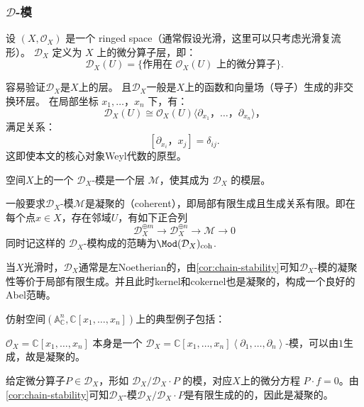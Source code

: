 \subsubsection{$\mathcal{D}$-模}
\begin{definition}
    设 $(X,\mathcal{O}_X)$ 是一个 ringed space（通常假设光滑，这里可以只考虑光滑复流形）。
    $\mathcal{D}_X$ 定义为 $X$ 上的微分算子层，即：
    \[
        \mathcal{D}_X(U) = \{ \text{作用在 } \mathcal{O}_X(U) \text{ 上的微分算子} \}.
    \]
\end{definition}
容易验证$\mathcal{D}_X$是$X$上的层。
且$\mathcal{D}_X$一般是$X$上的函数和向量场（导子）生成的非交换环层。
在局部坐标 $x_1,\dots，x_n$ 下，有：
\[
    \mathcal{D}_X(U) \cong \mathcal{O}_X(U)\langle \partial_{x_1}，\dots，\partial_{x_n} \rangle，
\]
满足关系：
\[
    [\partial_{x_i}， x_j] = \delta_{ij}.
\]
这即使本文的核心对象Weyl代数的原型。



\begin{definition}
    空间$X$上的一个 $\mathcal{D}_X$-模是一个层 $\mathcal{M}$，使其成为 $\mathcal{D}_X$ 的模层。
\end{definition}
\begin{remark}
    一般要求$\mathcal{D}_X$-模$\mathcal{M}$是凝聚的（coherent），即局部有限生成且生成关系有限。即在每个点$x\in X$，存在邻域$U$，有如下正合列
    \begin{equation*}
        \mathcal{D}_X^{\oplus m}\to \mathcal{D}_X^{\oplus n}\to \mathcal{M}\to 0
    \end{equation*}
    同时记这样的 $\mathcal{D}_X$-模构成的范畴为$\Mod(\mathcal{D}_X)_\text{coh}$.
\end{remark}
当$X$光滑时，$\mathcal{D}_X$通常是左Noetherian的，由\ref{cor:chain-stability}可知$\mathcal{D}_X$-模的凝聚性等价于局部有限生成。并且此时kernel和cokernel也是凝聚的，构成一个良好的Abel范畴。

仿射空间$\left(\mathbb{A}_{\mathbb{C}}^n,\mathbb{C}[x_1,\ldots,x_n]\right)$上的典型例子包括：
\begin{example}
    $\mathcal{O}_X=\mathbb{C}[x_1,\ldots,x_n]$ 本身是一个 $\mathcal{D}_X=\mathbb{C}[x_1,\ldots,x_n]\left\langle \partial_1,\ldots,\partial_n \right\rangle$-模，可以由$1$生成，故是凝聚的。
\end{example}
\begin{example}
    给定微分算子$P\in \mathcal{D}_X$，形如 $\mathcal{D}_X / \mathcal{D}_X \cdot P$ 的模，对应$X$上的微分方程 $P\cdot f=0$。由\ref{cor:chain-stability}可知$\mathcal{D}_X$-模$\mathcal{D}_X / \mathcal{D}_X \cdot P$是有限生成的的，因此是凝聚的。
\end{example}




